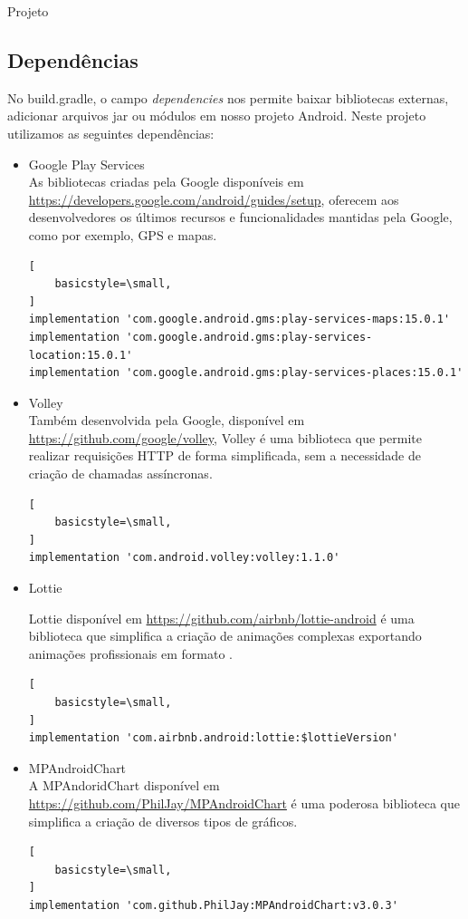 \documentclass[
	12pt,				%
	openany,			%
	twoside,			%
	a4paper,			%
	english,			%
	french,				%
	spanish,			%
	brazil				%
	]{abntex2}
\begin{document}
\begin{chapter}{Projeto}
\subsection{Dependências}
 No build.gradle, o campo \textit{dependencies} nos permite baixar bibliotecas externas, adicionar arquivos jar ou módulos em nosso projeto Android. Neste projeto utilizamos as seguintes dependências:
 
 
   \begin{itemize}
  \item{Google Play Services} \\
     As bibliotecas criadas pela Google disponíveis em \url{https://developers.google.com/android/guides/setup}, oferecem aos desenvolvedores os últimos recursos e funcionalidades mantidas pela Google, como por exemplo, GPS e mapas.
       \begin{lstlisting}[
    basicstyle=\small,
] 
implementation 'com.google.android.gms:play-services-maps:15.0.1'
implementation 'com.google.android.gms:play-services-location:15.0.1'
implementation 'com.google.android.gms:play-services-places:15.0.1'
\end{lstlisting}
\item{Volley} \\
   Também desenvolvida pela Google, disponível em \url{https://github.com/google/volley}, Volley é uma biblioteca que permite realizar requisições HTTP de forma simplificada, sem a necessidade de criação de chamadas assíncronas.
       \begin{lstlisting}[
    basicstyle=\small,
]
implementation 'com.android.volley:volley:1.1.0'  
\end{lstlisting}
\item{Lottie}

  Lottie disponível em \url{https://github.com/airbnb/lottie-android} é uma  biblioteca que simplifica a criação de animações complexas exportando animações profissionais em formato .
        \begin{lstlisting}[
    basicstyle=\small,
] 
implementation 'com.airbnb.android:lottie:$lottieVersion'
\end{lstlisting}
\item{MPAndroidChart} \\
   A  MPAndoridChart disponível em \url{https://github.com/PhilJay/MPAndroidChart} é uma poderosa biblioteca que simplifica a criação de diversos tipos de gráficos. 
        \begin{lstlisting}[
    basicstyle=\small,
] 
implementation 'com.github.PhilJay:MPAndroidChart:v3.0.3'
  

\end{lstlisting}
\end{itemize}
\end{chapter}
\end{document}
